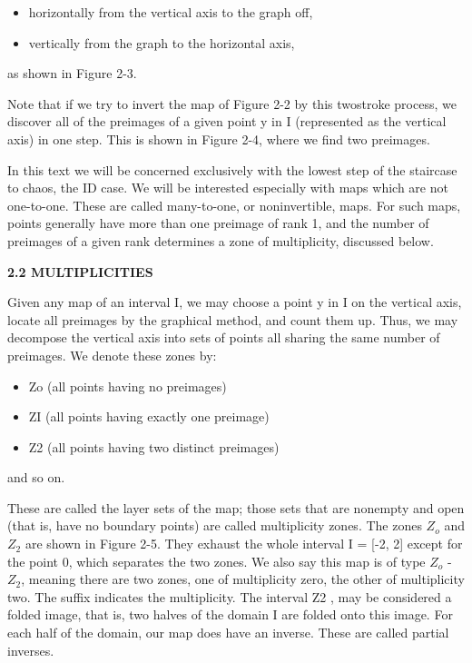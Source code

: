 \documentclass[12pt]{article}
\begin{document}
\begin{itemize}
\item horizontally from the vertical axis to the graph off,
\item vertically from the graph to the horizontal axis,
\end{itemize}

as shown in Figure 2-3.

Note that if we try to invert the map of Figure 2-2 by this twostroke
process, we discover all of the preimages of a given point y
in I (represented as the vertical axis) in one step. This is shown in
Figure 2-4, where we find two preimages.

\hfill

In this text we will be concerned exclusively with the lowest
step of the staircase to chaos, the ID case. We will be interested
especially with maps which are not one-to-one. These are called
many-to-one, or noninvertible, maps. For such maps, points generally
have more than one preimage of rank 1, and the number of
preimages of a given rank determines a zone of multiplicity, discussed
below.

\hfill

\textbf{2.2 MULTIPLICITIES}

\hfill

Given any map of an interval I, we may choose a point y in I on
the vertical axis, locate all preimages by the graphical method, and
count them up. Thus, we may decompose the vertical axis into sets
of points all sharing the same number of preimages. We denote
these zones by:

\begin{itemize}
\item Zo (all points having no preimages)
\item ZI (all points having exactly one preimage)
\item Z2 (all points having two distinct preimages)
\end{itemize}

and so on.

\hfill

These are called the layer sets of the map; those sets that are
nonempty and open (that is, have no boundary points) are called
multiplicity zones. The zones $Z_o$ and $Z_2$ are shown in Figure 2-5.
They exhaust the whole interval I = [-2, 2] except for the point 0,
which separates the two zones. We also say this map is of type $Z_o$ -
$Z_2$, meaning there are two zones, one of multiplicity zero, the other
of multiplicity two. The suffix indicates the multiplicity. The interval
Z2 , may be considered a folded image, that is, two halves of the
domain I are folded onto this image. For each half of the domain,
our map does have an inverse. These are called partial inverses.
\end{document}
